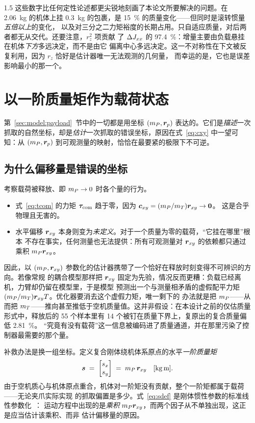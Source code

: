 \begin{spacing}{1.5}
这些数字比任何定性论述都更尖锐地刻画了本论文所要解决的问题。在 \SI{2.06}{\kg} 的机体上挂
\SI{0.3}{\kg} 的包裹，是 \SI{15}{\percent} 的质量变化——但同时是滚转惯量\emph{五倍以上}的变化，
以及对三分之二力矩裕度的长期占用。只自适应质量，对后两者都无从交代。还要注意，$r_z^2$ 项贡献
了 $\Delta J_{xx}$ 的 \SI{97.4}{\percent}：增量主要由负载悬挂在机体\emph{下方}多远决定，而不是由它
偏离中心多远决定。这一不对称性在下文被反复利用，因为 $r_z$ 恰好是估计器唯一无法观测的几何量，
而幸运的是，它也是误差影响最小的那一个。

\section{以一阶质量矩作为载荷状态}\label{sec:model:moment}

第~\ref{sec:model:payload}~节中的一切都是用坐标 $(m_P, \bm{r}_p)$ 表达的。它们是\emph{描述}一次
抓取的自然坐标，却是\emph{估计}一次抓取的错误坐标，原因在式~\eqref{eq:cxy} 中一望可知：从
$(m_P,\bm{r}_p)$ 到可观测量的映射，恰恰在最要紧的极限下不可逆。

\subsection{为什么偏移量是错误的坐标}\label{sec:model:whyS}

考察载荷被释放、即 $m_P \to 0$ 时各个量的行为。

\begin{itemize}
\item 式~\eqref{eq:tcom} 的力矩 $\bm{\tau}_{\mathrm{com}}$ 趋于零，因为 $\bm{c}_{xy} = (m_P/m_T)\bm{r}_{xy} \to \bm{0}$。
这是合乎物理且无害的。
\item 水平偏移 $\bm{r}_{xy}$ 本身则变为\emph{未定义}。对于一个质量为零的载荷，“它挂在哪里”根本
不存在事实，任何测量也无法提供：所有可观测量对 $\bm{r}_{xy}$ 的依赖都只通过乘积 $m_P\bm{r}_{xy}$。
\end{itemize}

因此，以 $(m_P, \bm{r}_{xy})$ 参数化的估计器携带了一个恰好在释放时刻变得不可辨识的方向。若像常规
的耦合模型那样把 $\bm{r}_{xy}$ 固定为先验，情况反而更糟：负载已经离机，力臂却仍留在模型里，于是模型
预测出一个与测量相矛盾的虚假配平力矩 $(m_P/m_T)\bm{r}_{xy}{}T$。优化器要消去这个虚假力矩，唯一剩下的
办法就是把 $m_P$——从而把 $m_T$——推向甚至推低于空机质量值。这并非假设：在本设计之前的仅估质量
形式中，释放后的 55 个样本里有 14 个被钉在质量下界上，复原出的复合质量偏低 \SI{2.81}{\percent}。
“究竟有没有载荷”这一信息被编码进了质量通道，并在那里污染了控制器最需要的那个量。

补救办法是换一组坐标。定义复合刚体绕机体系原点的水平\emph{一阶质量矩}
\begin{equation}
\svec \;=\; \begin{bmatrix} s_x \\ s_y\end{bmatrix}
\;=\; \mP\,\rxy \quad [\si{\kg\meter}].
\label{eq:sdef}
\end{equation}
由于空机质心与机体原点重合，机体对一阶矩没有贡献，整个一阶矩都属于载荷——无论夹爪实际实现
的抓取偏置是多少。式~\eqref{eq:sdef} 是刚体惯性参数的标准线性参数化~\cite{atkeson1986}：
运动方程中出现的是\emph{乘积} $m_P\bm{r}_{xy}$，而两个因子从不单独出现，这正是应当估计该乘积、而非
估计偏移量的原因。


\end{spacing}
